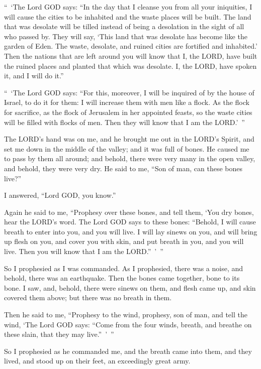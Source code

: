\myverse{}“ ‘The Lord GOD says: “In the day that I cleanse you from all
your iniquities, I will cause the cities to be inhabited and the waste places will be built.
\myverse{}The land that was desolate will be tilled instead of being a desolation in
the sight of all who passed by.
\myverse{}They will say, ‘This land that was desolate has become like the garden of
Eden. The waste, desolate, and ruined cities are fortified and inhabited.’
\myverse{}Then the nations that are left around you will know that I, the LORD, have
built the ruined places and planted that which was desolate. I, the LORD, have spoken it, and I will do
it.”

\myverse{}“ ‘The Lord GOD says: “For this, moreover, I will be inquired
of by the house of Israel, to do it for them: I will increase them with men like a flock.
\myverse{}As the flock for sacrifice, as the flock of Jerusalem in her appointed feasts,
so the waste cities will be filled with flocks of men. Then they will know that I am the LORD.’ ”


\mychapter{} \myverse*{}The LORD’s hand was on me, and he brought me out in the LORD’s
Spirit, and set me down in the middle of the valley; and it was full of bones.
\myverse{}He caused me to pass by them all around; and behold, there were very many in
the open valley, and behold, they were very dry.
\myverse{}He said to me, “Son of man, can these bones live?”

I answered, “Lord GOD, you know.”

\myverse{}Again he said to me, “Prophesy over these bones, and tell them,
‘You dry bones, hear the LORD’s word.
\myverse{}The Lord GOD says to these bones: “Behold, I will cause breath to enter into
you, and you will live.
\myverse{}I will lay sinews on you, and will bring up flesh on you, and cover you with
skin, and put breath in you, and you will live. Then you will know that I am the LORD.” ’ ”

\myverse{}So I prophesied as I was commanded. As I prophesied, there was
a noise, and behold, there was an earthquake. Then the bones came together, bone to its bone.
\myverse{}I saw, and, behold, there were sinews on them, and flesh came up, and skin
covered them above; but there was no breath in them.

\myverse{}Then he said to me, “Prophesy to the wind, prophesy, son of man,
and tell the wind, ‘The Lord GOD says: “Come from the four winds, breath, and breathe on these slain,
that they may live.” ’ ”

\myverse{}So I prophesied as he commanded me, and the breath came into
them, and they lived, and stood up on their feet, an exceedingly great army.

